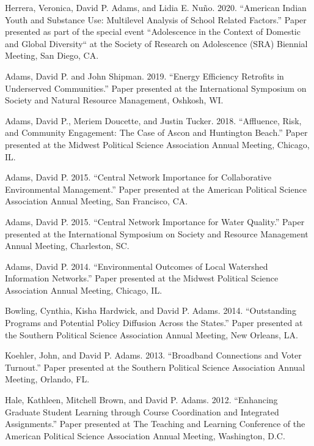 \documentclass[12pt,letterpaper]{article}
\renewenvironment{itemize}{
  \begin{list}{}{
    \setlength{\leftmargin}{1.5em}
    \setlength{\itemsep}{0.25em}
    \setlength{\parskip}{0pt}
    \setlength{\parsep}{0.25em}
  }
}{
  \end{list}
}
\begin{document}
\begin{itemize}
    \item Herrera, Veronica, David P. Adams, and Lidia E. Nuño. 2020. ``American Indian Youth and Substance Use: Multilevel Analysis of School Related Factors.'' Paper presented as part of the special event ``Adolescence in the Context of Domestic and Global Diversity`` at the Society of Research on Adolescence (SRA) Biennial Meeting, San Diego, CA.
    
    \item Adams, David P. and John Shipman. 2019. ``Energy Efficiency Retrofits in Underserved Communities.'' Paper presented at the International Symposium on Society and Natural Resource Management, Oshkosh, WI.
    
    \item Adams, David P., Meriem Doucette, and Justin Tucker. 2018. ``Affluence, Risk, and Community Engagement: The Case of Ascon and Huntington Beach.'' Paper presented at the Midwest Political Science Association Annual Meeting, Chicago, IL.
    
    \item Adams, David P. 2015. ``Central Network Importance for Collaborative Environmental Management.'' Paper presented at the American Political Science Association Annual Meeting, San Francisco, CA.
    
    \item Adams, David P. 2015. ``Central Network Importance for Water Quality.'' Paper presented at the International Symposium on Society and Resource Management Annual Meeting, Charleston, SC.
    
    \item Adams, David P. 2014. ``Environmental Outcomes of Local Watershed Information Networks.'' Paper presented at the Midwest Political Science Association Annual Meeting, Chicago, IL.
    
    \item Bowling, Cynthia, Kisha Hardwick, and David P. Adams. 2014. ``Outstanding Programs and Potential Policy Diffusion Across the States.'' Paper presented at the Southern Political Science Association Annual Meeting, New Orleans, LA.
    
    \item Koehler, John, and David P. Adams. 2013. ``Broadband Connections and Voter Turnout.'' Paper presented at the Southern Political Science Association Annual Meeting, Orlando, FL.
    
    \item Hale, Kathleen, Mitchell Brown, and David P. Adams. 2012. ``Enhancing Graduate Student Learning through Course Coordination and Integrated Assignments.'' Paper presented at The Teaching and Learning Conference of the American Political Science Association Annual Meeting, Washington, D.C.
    

\end{itemize}
\end{document}

